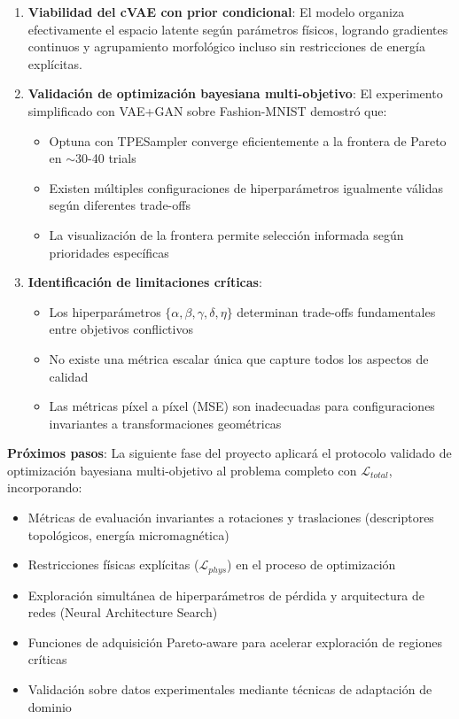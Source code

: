 \documentclass[12pt]{article}
\begin{document}
\begin{enumerate}
    \item \textbf{Viabilidad del cVAE con prior condicional}: El modelo organiza efectivamente el espacio latente según parámetros físicos, logrando gradientes continuos y agrupamiento morfológico incluso sin restricciones de energía explícitas.

    \item \textbf{Validación de optimización bayesiana multi-objetivo}: El experimento simplificado con VAE+GAN sobre Fashion-MNIST demostró que:
    \begin{itemize}
        \item Optuna con TPESampler converge eficientemente a la frontera de Pareto en $\sim$30-40 trials
        \item Existen múltiples configuraciones de hiperparámetros igualmente válidas según diferentes trade-offs
        \item La visualización de la frontera permite selección informada según prioridades específicas
    \end{itemize}

    \item \textbf{Identificación de limitaciones críticas}:
    \begin{itemize}
        \item Los hiperparámetros $\{\alpha, \beta, \gamma, \delta, \eta\}$ determinan trade-offs fundamentales entre objetivos conflictivos
        \item No existe una métrica escalar única que capture todos los aspectos de calidad
        \item Las métricas píxel a píxel (MSE) son inadecuadas para configuraciones invariantes a transformaciones geométricas
    \end{itemize}
\end{enumerate}

\textbf{Próximos pasos}: La siguiente fase del proyecto aplicará el protocolo validado de optimización bayesiana multi-objetivo al problema completo con $\mathcal{L}_{total}$, incorporando:

\begin{itemize}
    \item Métricas de evaluación invariantes a rotaciones y traslaciones (descriptores topológicos, energía micromagnética)
    \item Restricciones físicas explícitas ($\mathcal{L}_{phys}$) en el proceso de optimización
    \item Exploración simultánea de hiperparámetros de pérdida y arquitectura de redes (Neural Architecture Search)
    \item Funciones de adquisición Pareto-aware para acelerar exploración de regiones críticas
    \item Validación sobre datos experimentales mediante técnicas de adaptación de dominio
\end{itemize}

% 
% 
\end{document}

